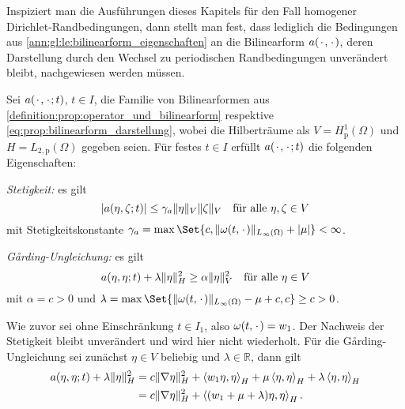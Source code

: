 Inspiziert man die Ausführungen dieses Kapitels für den Fall homogener Dirichlet-Randbedingungen, dann stellt man fest, dass lediglich die Bedingungen aus \cref{ann:gl:le:bilinearform_eigenschaften} an die Bilinearform $a({\mkern2mu\cdot\mkern2mu}, {\mkern2mu\cdot\mkern2mu})$, deren Darstellung durch den Wechsel zu periodischen Randbedingungen unverändert bleibt, nachgewiesen werden müssen.

\begin{Lemma}
    Sei $a({\mkern2mu\cdot\mkern2mu}, {\mkern2mu\cdot\mkern2mu}; t)$, $t \in I$, die Familie von Bilinearformen aus \cref{definition:prop:operator_und_bilinearform} respektive \cref{eq:prop:bilinearform_darstellung}, wobei die Hilberträume als $V = H^{1}_{\text{p}}(\Omega)$ und $H = L_{2,\text{p}}(\Omega)$ gegeben seien.
    Für festes $t \in I$ erfüllt $a({\mkern2mu\cdot\mkern2mu}, {\mkern2mu\cdot\mkern2mu}; t)$ die folgenden Eigenschaften:
    \begin{thmenumerate}
        \item\label{satz:ps:rzvp:bilinearform_a_eigenschaften_stetig}
        \emph{Stetigkeit:} es gilt
        \begin{equation}
            \label{eq:ps:rzvp:bilinearform_a_eigenschaften_stetig}
            \lvert a(\eta, \zeta; t)\rvert \leq \gamma_{a} \lVert\eta\rVert_{V} \lVert\zeta\rVert_{V} \quad \text{für alle}~\eta, \zeta \in V
        \end{equation}
        mit Stetigkeitskonstante $\gamma_{a} = \max\Set{c, \norm{\omega(t, \blank)}_{L_{\infty}(\Omega)} + \abs{\mu}} < \infty$.
        \item\label{satz:ps:rzvp:bilinearform_a_eigenschaften_garding}
        \emph{G\aa{}rding-Ungleichung:} es gilt
        \begin{equation}
            \label{eq:ps:rzvp:bilinearform_a_eigenschaften_garding}
            a(\eta, \eta; t) + \lambda \lVert\eta\rVert_{H}^{2} \geq \alpha \lVert\eta\rVert_{V}^{2} \quad \text{für alle}~\eta \in V
        \end{equation}
        mit $\alpha = c > 0$ und $\lambda = \max\Set{\norm{\omega(t, \blank)}_{L_{\infty}(\Omega)} - \mu + c, c} \geq c > 0$.
    \end{thmenumerate}

    \begin{Beweis}
        Wie zuvor sei ohne Einschränkung $t \in I_{1}$, also $\omega(t, {\mkern2mu\cdot\mkern2mu}) = w_{1}$.
        Der Nachweis der Stetigkeit bleibt unverändert und wird hier nicht wiederholt.
        Für die G\aa{}rding-Ungleichung sei zunächst $\eta \in V$ beliebig und $\lambda \in \mathbb{R}$, dann gilt
        \begin{align}
            a(\eta, \eta; t) + \lambda \lVert\eta\rVert^{2}_{H}
            &= c \lVert\nabla \eta\rVert^{2}_{H} + \left\langle w_{1} \eta,\eta\right\rangle_{H} + \mu \left\langle\eta,\eta\right\rangle_{H} + \lambda \left\langle\eta,\eta\right\rangle_{H}
            \\&= c \lVert\nabla \eta\rVert^{2}_{H} + \left\langle(w_{1} + \mu + \lambda) \eta,\eta\right\rangle_{H}.
        \end{align}


\end{Beweis}
\end{Lemma}
